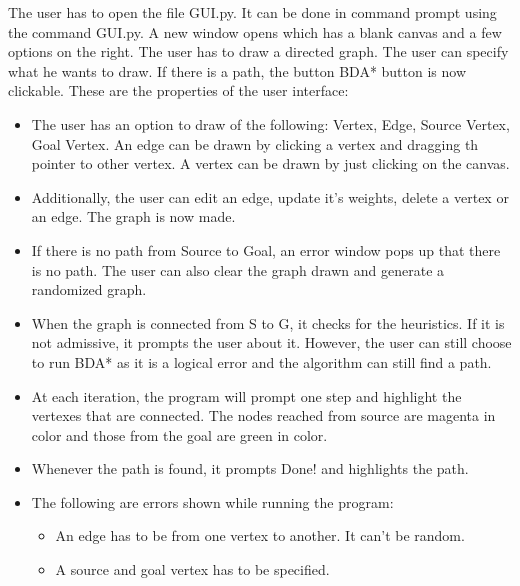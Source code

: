 \textnormal{
The user has to open the file GUI.py. It can be done in command prompt using the command GUI.py. A new window opens which has a blank canvas and a few options on the right. The user has to draw a directed graph. The user can specify what he wants to draw. If there is a path, the button BDA* button is now clickable. These are the properties of the user interface: }
\begin{itemize}
    \item The user has an option to draw of the following: Vertex, Edge, Source Vertex, Goal Vertex. An edge can be drawn by clicking a vertex and dragging th pointer to other vertex. A vertex can be drawn by just clicking on the canvas. 
    \item Additionally, the user can edit an edge, update it's weights, delete a vertex or an edge. The graph is now made. 
    \item If there is no path from Source to Goal, an error window pops up that there is no path. The user can also clear the graph drawn and generate a randomized graph. 
    \item When the graph is connected from S to G, it checks for the heuristics. If it is not admissive, it prompts the user about it. However, the user can still choose to run BDA* as it is a logical error and the algorithm can still find a path. 
    \item At each iteration, the program will prompt one step and highlight the vertexes that are connected. The nodes reached from source are magenta in color and those from the goal are green in color. 
    \item Whenever the path is found, it prompts Done! and highlights the path.\
    \item The following are errors shown while running the program:
    \begin{itemize}
        \item An edge has to be from one vertex to another. It can't be random. 
        \item A source and goal vertex has to be specified. 
    \end{itemize}
\end{itemize}


